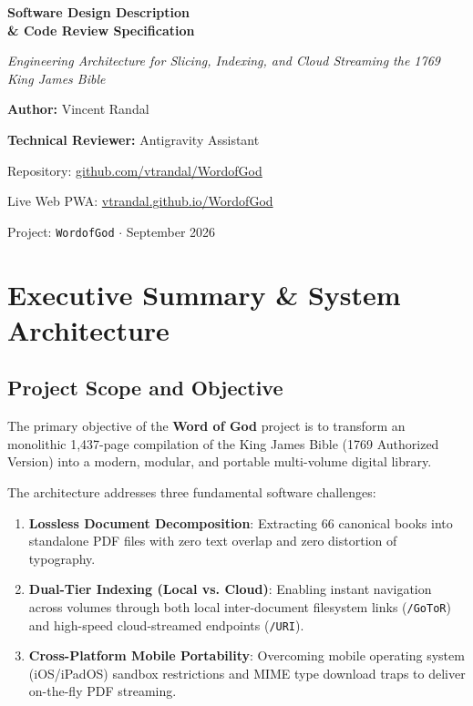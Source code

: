 \documentclass[11pt,letterpaper]{article}
\begin{document}
\begin{titlepage}
    \centering
    \vspace*{2cm}
    {\huge\bfseries Software Design Description\\[0.3em] \& Code Review Specification\par}
    \vspace{1cm}
    {\Large\itshape Engineering Architecture for Slicing, Indexing, and Cloud Streaming the 1769 King James Bible\par}
    \vspace{2cm}
    {\large\textbf{Author:} Vincent Randal\par}
    {\large\textbf{Technical Reviewer:} Antigravity Assistant\par}
    \vspace{1cm}
    {\large Repository: \href{https://github.com/vtrandal/WordofGod}{github.com/vtrandal/WordofGod}\par}
    \vspace{0.3cm}
    {\large Live Web PWA: \href{https://vtrandal.github.io/WordofGod/}{vtrandal.github.io/WordofGod}\par}
    \vspace{2cm}
    \vfill
    {\normalsize Project: \texttt{WordofGod} $\cdot$ September 2026\par}
\end{titlepage}

\tableofcontents
\newpage

\section{Executive Summary \& System Architecture}

\subsection{Project Scope and Objective}
The primary objective of the \textbf{Word of God} project is to transform an monolithic 1,437-page compilation of the King James Bible (1769 Authorized Version) into a modern, modular, and portable multi-volume digital library. 

The architecture addresses three fundamental software challenges:
\begin{enumerate}
    \item \textbf{Lossless Document Decomposition}: Extracting 66 canonical books into standalone PDF files with zero text overlap and zero distortion of typography.
    \item \textbf{Dual-Tier Indexing (Local vs. Cloud)}: Enabling instant navigation across volumes through both local inter-document filesystem links (\texttt{/GoToR}) and high-speed cloud-streamed endpoints (\texttt{/URI}).
    \item \textbf{Cross-Platform Mobile Portability}: Overcoming mobile operating system (iOS/iPadOS) sandbox restrictions and MIME type download traps to deliver on-the-fly PDF streaming.
\end{enumerate}
\end{document}

